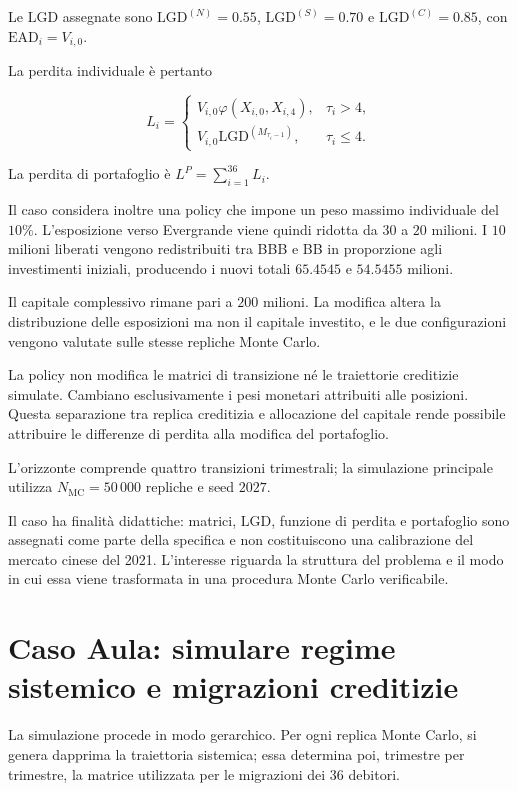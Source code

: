 Le $\mathrm{LGD}$ assegnate sono $\mathrm{LGD}^{(N)}=0.55$,
$\mathrm{LGD}^{(S)}=0.70$ e
$\mathrm{LGD}^{(C)}=0.85$, con $\mathrm{EAD}_i=V_{i,0}$.

La perdita individuale \`e pertanto

\[
L_i
=
\begin{cases}
V_{i,0}\varphi(X_{i,0},X_{i,4}),
&
\tau_i>4,
\\[4pt]
V_{i,0}\mathrm{LGD}^{(M_{\tau_i-1})},
&
\tau_i\leq4.
\end{cases}
\]

La perdita di portafoglio \`e $L^P=\sum_{i=1}^{36}L_i$.

Il caso considera inoltre una policy che impone un peso massimo individuale
del $10\%$. L'esposizione verso Evergrande viene quindi ridotta da $30$ a
$20$ milioni. I $10$ milioni liberati vengono redistribuiti tra BBB e BB in
proporzione agli investimenti iniziali, producendo i nuovi totali
$65.4545$ e $54.5455$ milioni.

Il capitale complessivo rimane pari a $200$ milioni. La modifica altera la
distribuzione delle esposizioni ma non il capitale investito, e le due
configurazioni vengono valutate sulle stesse repliche Monte Carlo.

La policy non modifica le matrici di transizione n\'e le traiettorie
creditizie simulate. Cambiano esclusivamente i pesi monetari attribuiti alle
posizioni. Questa separazione tra replica creditizia e allocazione del
capitale rende possibile attribuire le differenze di perdita alla modifica
del portafoglio.

L'orizzonte comprende quattro transizioni trimestrali; la simulazione
principale utilizza $N_{\mathrm{MC}}=50\,000$ repliche e seed $2027$.

Il caso ha finalit\`a didattiche: matrici, $\mathrm{LGD}$, funzione di perdita e
portafoglio sono assegnati come parte della specifica e non costituiscono una
calibrazione del mercato cinese del 2021. L'interesse riguarda la struttura
del problema e il modo in cui essa viene trasformata in una procedura Monte
Carlo verificabile.
%


\section{Caso Aula: simulare regime sistemico e migrazioni creditizie}

La simulazione procede in modo gerarchico. Per ogni replica Monte Carlo, si
genera dapprima la traiettoria sistemica; essa determina poi, trimestre per
trimestre, la matrice utilizzata per le migrazioni dei $36$ debitori.

